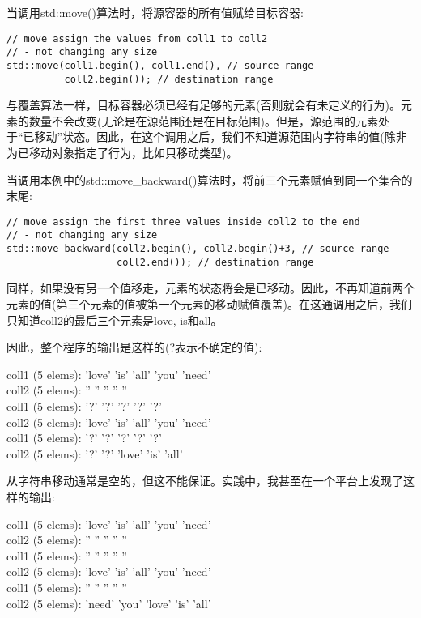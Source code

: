 当调用std::move()算法时，将源容器的所有值赋给目标容器:\par

\begin{lstlisting}[caption={}]
// move assign the values from coll1 to coll2
// - not changing any size
std::move(coll1.begin(), coll1.end(), // source range
		  coll2.begin()); // destination range
\end{lstlisting}

与覆盖算法一样，目标容器必须已经有足够的元素(否则就会有未定义的行为)。元素的数量不会改变(无论是在源范围还是在目标范围)。但是，源范围的元素处于“已移动”状态。因此，在这个调用之后，我们不知道源范围内字符串的值(除非为已移动对象指定了行为，比如只移动类型)。\par

当调用本例中的std::move\_backward()算法时，将前三个元素赋值到同一个集合的末尾:\par

\begin{lstlisting}[caption={}]
// move assign the first three values inside coll2 to the end
// - not changing any size
std::move_backward(coll2.begin(), coll2.begin()+3, // source range
				   coll2.end()); // destination range
\end{lstlisting}

同样，如果没有另一个值移走，元素的状态将会是已移动。因此，不再知道前两个元素的值(第三个元素的值被第一个元素的移动赋值覆盖)。在这通调用之后，我们只知道coll2的最后三个元素是love, is和all。\par

因此，整个程序的输出是这样的(?表示不确定的值):\par

\begin{tcolorbox}[colback=white,colframe=black]
	coll1 (5 elems): 'love' 'is' 'all' 'you' 'need' \\
	coll2 (5 elems): '' '' '' '' '' \\
	coll1 (5 elems): '?' '?' '?' '?' '?' \\
	coll2 (5 elems): 'love' 'is' 'all' 'you' 'need' \\
	coll1 (5 elems): '?' '?' '?' '?' '?' \\
	coll2 (5 elems): '?' '?' 'love' 'is' 'all'
\end{tcolorbox}

从字符串移动通常是空的，但这不能保证。实践中，我甚至在一个平台上发现了这样的输出:\par

\begin{tcolorbox}[colback=white,colframe=black]
	coll1 (5 elems): 'love' 'is' 'all' 'you' 'need' \\
	coll2 (5 elems): '' '' '' '' '' \\
	coll1 (5 elems): '' '' '' '' '' \\
	coll2 (5 elems): 'love' 'is' 'all' 'you' 'need' \\
	coll1 (5 elems): '' '' '' '' '' \\
	coll2 (5 elems): 'need' 'you' 'love' 'is' 'all'
\end{tcolorbox}


